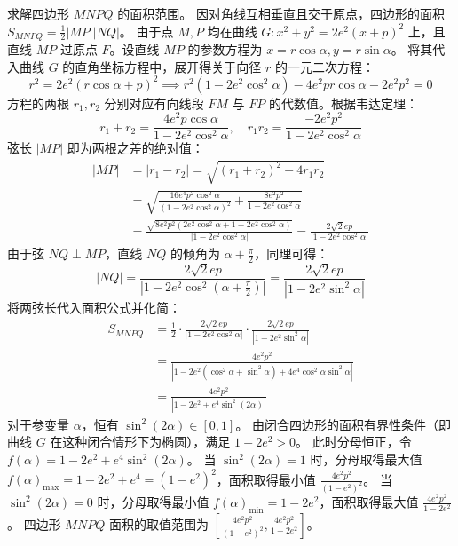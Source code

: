 \begin{solution}
求解四边形 $MNPQ$ 的面积范围。
因对角线互相垂直且交于原点，四边形的面积 $S_{MNPQ} = \frac{1}{2}|MP||NQ|$。
由于点 $M, P$ 均在曲线 $G: x^2 + y^2 = 2e^2(x+p)^2$ 上，且直线 $MP$ 过原点 $F$。设直线 $MP$ 的参数方程为 $x = r\cos\alpha, y = r\sin\alpha$。
将其代入曲线 $G$ 的直角坐标方程中，展开得关于向径 $r$ 的一元二次方程：
$$ r^2 = 2e^2(r\cos\alpha + p)^2 \implies r^2(1 - 2e^2\cos^2\alpha) - 4e^2 p r\cos\alpha - 2e^2 p^2 = 0 $$
方程的两根 $r_1, r_2$ 分别对应有向线段 $FM$ 与 $FP$ 的代数值。根据韦达定理：
$$ r_1 + r_2 = \frac{4e^2 p\cos\alpha}{1 - 2e^2\cos^2\alpha}, \quad r_1 r_2 = \frac{-2e^2 p^2}{1 - 2e^2\cos^2\alpha} $$
弦长 $|MP|$ 即为两根之差的绝对值：
\begin{align*}
|MP| &= |r_1 - r_2| = \sqrt{(r_1+r_2)^2 - 4r_1 r_2} \\
&= \sqrt{\frac{16e^4 p^2\cos^2\alpha}{(1 - 2e^2\cos^2\alpha)^2} + \frac{8e^2 p^2}{1 - 2e^2\cos^2\alpha}} \\
&= \frac{\sqrt{8e^2 p^2(2e^2\cos^2\alpha + 1 - 2e^2\cos^2\alpha)}}{|1 - 2e^2\cos^2\alpha|} = \frac{2\sqrt{2}ep}{|1 - 2e^2\cos^2\alpha|}
\end{align*}
由于弦 $NQ \perp MP$，直线 $NQ$ 的倾角为 $\alpha + \frac{\pi}{2}$，同理可得：
$$ |NQ| = \frac{2\sqrt{2}ep}{|1 - 2e^2\cos^2(\alpha+\frac{\pi}{2})|} = \frac{2\sqrt{2}ep}{|1 - 2e^2\sin^2\alpha|} $$
将两弦长代入面积公式并化简：
\begin{align*}
S_{MNPQ} &= \frac{1}{2} \cdot \frac{2\sqrt{2}ep}{|1 - 2e^2\cos^2\alpha|} \cdot \frac{2\sqrt{2}ep}{|1 - 2e^2\sin^2\alpha|} \\
&= \frac{4e^2 p^2}{|1 - 2e^2(\cos^2\alpha + \sin^2\alpha) + 4e^4\cos^2\alpha\sin^2\alpha|} \\
&= \frac{4e^2 p^2}{|1 - 2e^2 + e^4\sin^2(2\alpha)|}
\end{align*}
对于参变量 $\alpha$，恒有 $\sin^2(2\alpha) \in [0, 1]$。
由闭合四边形的面积有界性条件（即曲线 $G$ 在这种闭合情形下为椭圆），满足 $1 - 2e^2 > 0$。
此时分母恒正，令 $f(\alpha) = 1 - 2e^2 + e^4\sin^2(2\alpha)$。
当 $\sin^2(2\alpha) = 1$ 时，分母取得最大值 $f(\alpha)_{\max} = 1 - 2e^2 + e^4 = (1-e^2)^2$，面积取得最小值 $\frac{4e^2 p^2}{(1-e^2)^2}$。
当 $\sin^2(2\alpha) = 0$ 时，分母取得最小值 $f(\alpha)_{\min} = 1 - 2e^2$，面积取得最大值 $\frac{4e^2 p^2}{1-2e^2}$。
四边形 $MNPQ$ 面积的取值范围为 $\left[ \frac{4e^2 p^2}{(1-e^2)^2}, \frac{4e^2 p^2}{1-2e^2} \right]$。
\end{solution}


